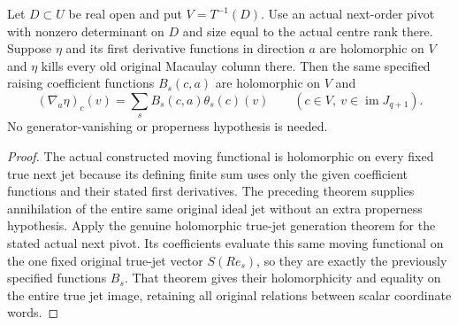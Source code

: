 \begin{theorem}
\label{hir:actual-unconditional-holomorphic-dual-jet-raising}
\leanok
Let $D\subset U$ be real open and put $V=T^{-1}(D)$. Use an actual
next-order pivot with nonzero determinant on $D$ and size equal to
the actual centre rank there. Suppose $\eta$ and its first derivative
functions in direction $a$ are holomorphic on $V$ and $\eta$ kills
every old original Macaulay column there. Then the same specified
raising coefficient functions $B_s(c,a)$ are holomorphic on $V$ and
\[
 (\nabla_a\eta)_c(v)=\sum_s B_s(c,a)\theta_s(c)(v)
 \qquad(c\in V,\ v\in\operatorname{im}J_{q+1}).
\]
No generator-vanishing or properness hypothesis is needed.
\end{theorem}
\begin{proof}
The actual constructed moving functional is holomorphic on every
fixed true next jet because its defining finite sum uses only the
given coefficient functions and their stated first derivatives. The
preceding theorem supplies annihilation of the entire same original
ideal jet without an extra properness hypothesis. Apply the genuine
holomorphic true-jet generation theorem for the stated actual next
pivot. Its coefficients evaluate this same moving functional on the
one fixed original true-jet vector $S(R e_s)$, so they are exactly
the previously specified functions $B_s$. That theorem gives their
holomorphicity and equality on the entire true jet image, retaining
all original relations between scalar coordinate words.
\end{proof}


